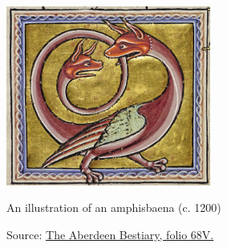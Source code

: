 \begin{uomappendix}
                \begin{figure}[h]
                    \centering
                    \includegraphics[width=0.6\textwidth]{images/Amphisbaena.png}
                    \caption{An illustration of an amphisbaena (c. 1200)}
                    \label{fig:amphisbaena}
                    \caption*{Source: \href{https://www.abdn.ac.uk/bestiary/ms24/f68v}{The Aberdeen Bestiary, folio 68V.}}
                \end{figure}
        
    \end{uomappendix}
    
    
    